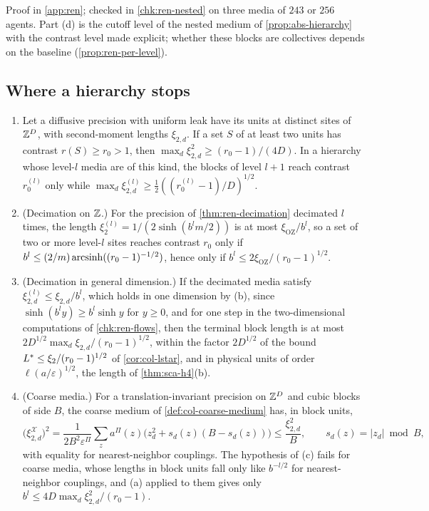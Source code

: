 Proof in \cref{app:ren}; checked in \cref{chk:ren-nested} on three media of $243$ or $256$ agents. Part (d) is the cutoff level of the nested medium of \cref{prop:abs-hierarchy} with the contrast level made explicit; whether these blocks are collectives depends on the baseline (\cref{prop:ren-per-level}).

\subsection{Where a hierarchy stops}\label{sec:ren-depth}

\begin{proposition}\label{prop:ren-depth}
\begin{enumerate}
\item[(a)] Let a diffusive precision with uniform leak have its units at distinct sites of $\mathbb{Z}^D$, with second-moment lengths $\xi_{2,d}$. If a set $S$ of at least two units has contrast $r(S)\ge r_0>1$, then $\max_d\xi_{2,d}^2\ge(r_0-1)/(4D)$. In a hierarchy whose level-$l$ media are of this kind, the blocks of level $l+1$ reach contrast $r^{(l)}_0$ only while $\max_d\xi^{(l)}_{2,d}\ge\frac12((r^{(l)}_0-1)/D)^{1/2}$.
\item[(b)] (Decimation on $\mathbb{Z}$.) For the precision of \cref{thm:ren-decimation} decimated $l$ times, the length $\xi^{(l)}_2=1/(2\sinh(b^lm/2))$ is at most $\xi_{\mathrm{OZ}}/b^l$, so a set of two or more level-$l$ sites reaches contrast $r_0$ only if $b^l\le(2/m)\operatorname{arcsinh}((r_0-1)^{-1/2})$, hence only if $b^l\le2\xi_{\mathrm{OZ}}/(r_0-1)^{1/2}$.
\item[(c)] (Decimation in general dimension.) If the decimated media satisfy $\xi^{(l)}_{2,d}\le\xi_{2,d}/b^l$, which holds in one dimension by (b), since $\sinh(b^ly)\ge b^l\sinh y$ for $y\ge0$, and for one step in the two-dimensional computations of \cref{chk:ren-flows}, then the terminal block length is at most $2D^{1/2}\max_d\xi_{2,d}/(r_0-1)^{1/2}$, within the factor $2D^{1/2}$ of the bound $L^{\ast}\le\xi_2/(r_0-1)^{1/2}$ of \cref{cor:col-lstar}, and in physical units of order $\ell(a/\varepsilon)^{1/2}$, the length of \cref{thm:sca-h4}(b).
\item[(d)] (Coarse media.) For a translation-invariant precision on $\mathbb{Z}^D$ and cubic blocks of side $B$, the coarse medium of \cref{def:col-coarse-medium} has, in block units,
\[
\bigl(\xi^{\mathcal X}_{2,d}\bigr)^2=\frac{1}{2B^2\varepsilon^\Pi}\sum_za^\Pi(z)\bigl(z_d^2+s_d(z)(B-s_d(z))\bigr)\le\frac{\xi_{2,d}^2}B,\qquad s_d(z)=\lvert z_d\rvert\bmod B,
\]
with equality for nearest-neighbor couplings. The hypothesis of (c) fails for coarse media, whose lengths in block units fall only like $b^{-l/2}$ for nearest-neighbor couplings, and (a) applied to them gives only $b^l\le4D\max_d\xi_{2,d}^2/(r_0-1)$.
\end{enumerate}
\end{proposition}
